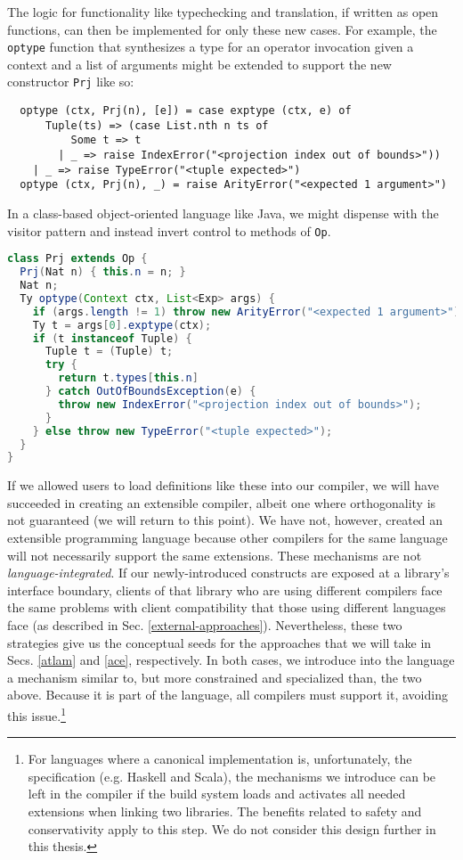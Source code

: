 The logic for functionality like typechecking and translation, if written as open functions, can then be implemented for only these new cases. For example, the \verb|optype| function that synthesizes a type for an operator invocation given a context and a list of arguments might be extended to support the new constructor \verb|Prj| like so:
\begin{lstlisting}
  optype (ctx, Prj(n), [e]) = case exptype (ctx, e) of 
      Tuple(ts) => (case List.nth n ts of 
          Some t => t
        | _ => raise IndexError("<projection index out of bounds>"))
    | _ => raise TypeError("<tuple expected>")
  optype (ctx, Prj(n), _) = raise ArityError("<expected 1 argument>")
\end{lstlisting}

In a class-based object-oriented language like Java, we might dispense with the visitor pattern and instead invert control to methods of \verb|Op|. 

\begin{lstlisting}[language=Java]
class Prj extends Op {
  Prj(Nat n) { this.n = n; }
  Nat n;
  Ty optype(Context ctx, List<Exp> args) {
    if (args.length != 1) throw new ArityError("<expected 1 argument>")
    Ty t = args[0].exptype(ctx);
    if (t instanceof Tuple) {
      Tuple t = (Tuple) t;
      try {
        return t.types[this.n]
      } catch OutOfBoundsException(e) {
        throw new IndexError("<projection index out of bounds>");
      }
    } else throw new TypeError("<tuple expected>");
  }
}
\end{lstlisting} 

If we allowed users to load definitions like these into our compiler, we will have succeeded in creating an  extensible compiler, albeit one where orthogonality is not guaranteed (we will return to this point). We have not, however, created an extensible programming language because other compilers for the same language will not necessarily support the same extensions. These mechanisms are not \emph{language-integrated}. 
If our newly-introduced constructs are exposed at a library's  interface boundary, clients of that library who are using different compilers face the same problems with client compatibility that those using different languages face (as described in Sec. \ref{external-approaches}). %
Nevertheless, these two strategies give us the conceptual seeds for the approaches that we will take in Secs. \ref{atlam} and \ref{ace}, respectively. 
In both cases, we introduce into the language a mechanism similar to, but more constrained and specialized  than, the two above.  Because it is part of the language, all compilers must support it, avoiding this issue.\footnote{For  languages where a canonical implementation {is}, unfortunately, the specification (e.g. Haskell and Scala), the mechanisms we introduce can be left in the compiler if the build system loads and activates all needed extensions when linking two libraries. The benefits related to safety and conservativity apply to this step. We do not consider this design further in this thesis.}

